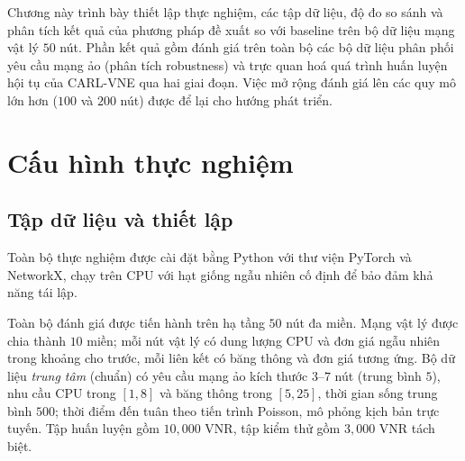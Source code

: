 \documentclass[../DoAn.tex]{subfiles}
\begin{document}
\let\savedaddcontentsline\addcontentsline
\renewcommand{\addcontentsline}[3]{%
  \def\carltmpa{#2}\def\carltmpb{subsection}%
  \ifx\carltmpa\carltmpb\else\savedaddcontentsline{#1}{#2}{#3}\fi}
\label{ch:thuc_nghiem}

Chương này trình bày thiết lập thực nghiệm, các tập dữ liệu, độ đo so sánh và phân tích kết quả của phương pháp đề xuất so với baseline trên bộ dữ liệu mạng vật lý $50$ nút. Phần kết quả gồm đánh giá trên toàn bộ các bộ dữ liệu phân phối yêu cầu mạng ảo (phân tích robustness) và trực quan hoá quá trình huấn luyện hội tụ của CARL-VNE qua hai giai đoạn. Việc mở rộng đánh giá lên các quy mô lớn hơn ($100$ và $200$ nút) được để lại cho hướng phát triển.

\section{Cấu hình thực nghiệm}              %
\label{sec:exp-setup}

\subsection{Tập dữ liệu và thiết lập}
\label{subsec:exp-setup-data}

Toàn bộ thực nghiệm được cài đặt bằng Python với thư viện PyTorch và NetworkX, chạy trên CPU với hạt giống ngẫu nhiên cố định để bảo đảm khả năng tái lập.

Toàn bộ đánh giá được tiến hành trên hạ tầng $50$ nút đa miền. Mạng vật lý được chia thành $10$ miền; mỗi nút vật lý có dung lượng CPU và đơn giá ngẫu nhiên trong khoảng cho trước, mỗi liên kết có băng thông và đơn giá tương ứng. Bộ dữ liệu \textit{trung tâm} (chuẩn) có yêu cầu mạng ảo kích thước $3$–$7$ nút (trung bình $5$), nhu cầu CPU trong $[1, 8]$ và băng thông trong $[5, 25]$, thời gian sống trung bình $500$; thời điểm đến tuân theo tiến trình Poisson, mô phỏng kịch bản trực tuyến. Tập huấn luyện gồm $10{,}000$ VNR, tập kiểm thử gồm $3{,}000$ VNR tách biệt.
\end{document}
